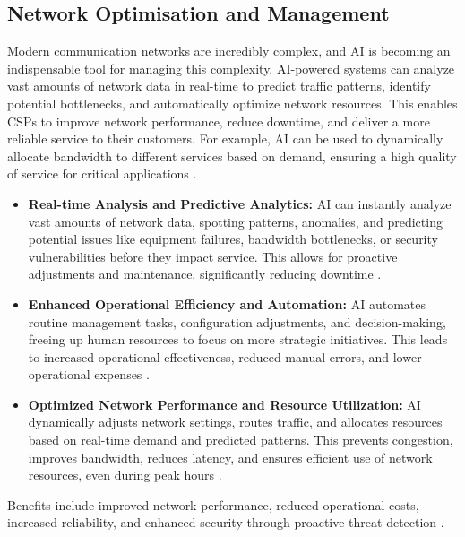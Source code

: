 \subsection{Network Optimisation and Management}
Modern communication networks are incredibly complex, and AI is becoming an indispensable tool for managing this complexity. AI-powered systems can analyze vast amounts of network data in real-time to predict traffic patterns, identify potential bottlenecks, and automatically optimize network resources. This enables CSPs to improve network performance, reduce downtime, and deliver a more reliable service to their customers. For example, AI can be used to dynamically allocate bandwidth to different services based on demand, ensuring a high quality of service for critical applications \cite{kumar2019role}.
\begin{itemize}
    \item \textbf{Real-time Analysis and Predictive Analytics:} AI can instantly analyze vast amounts of network data, spotting patterns, anomalies, and predicting potential issues like equipment failures, bandwidth bottlenecks, or security vulnerabilities before they impact service. This allows for proactive adjustments and maintenance, significantly reducing downtime \cite{BirchwoodU_NetworkOpt, HapticNetworks_NetworkOpt}.
    \item \textbf{Enhanced Operational Efficiency and Automation:} AI automates routine management tasks, configuration adjustments, and decision-making, freeing up human resources to focus on more strategic initiatives. This leads to increased operational effectiveness, reduced manual errors, and lower operational expenses \cite{Intel_NetworkOpt, Nilesecure_NetworkOpt}.
    \item \textbf{Optimized Network Performance and Resource Utilization:} AI dynamically adjusts network settings, routes traffic, and allocates resources based on real-time demand and predicted patterns. This prevents congestion, improves bandwidth, reduces latency, and ensures efficient use of network resources, even during peak hours \cite{Ericsson_NetworkOpt, OrhanErgun_NetworkOpt}.
\end{itemize}
Benefits include improved network performance, reduced operational costs, increased reliability, and enhanced security through proactive threat detection \cite{DLink_NetworkOpt, GrabTheAxe_NetworkOpt}.

